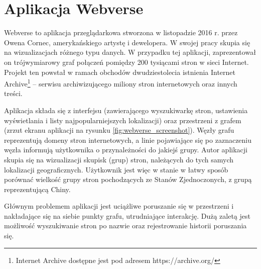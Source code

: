 \section{Aplikacja Webverse}

Webverse \cite{Webverse} to aplikacja przeglądarkowa stworzona w listopadzie 2016 r. przez Owena Cornec, amerykańskiego artystę i dewelopera. W swojej pracy skupia się na wizualizacjach różnego typu danych. W przypadku tej aplikacji, zaprezentował on trójwymiarowy graf połączeń pomiędzy 200 tysiącami stron w sieci Internet. Projekt ten powstał w ramach obchodów dwudziestolecia istnienia Internet Archive\footnote{Internet Archive dostępne jest pod adresem https://archive.org/} – serwisu archiwizującego miliony stron internetowych oraz innych treści.

Aplikacja składa się z interfejsu (zawierającego wyszukiwarkę stron, ustawienia wyświetlania i listy najpopularniejszych lokalizacji) oraz przestrzeni z grafem (zrzut ekranu aplikacji na rysunku \ref{fig:webverse_screenshot}). Węzły grafu reprezentują domeny stron internetowych, a linie pojawiające się po zaznaczeniu węzła informują użytkownika o przynależności do jakiejś grupy. Autor aplikacji skupia się na wizualizacji skupisk (grup) stron, należących do tych samych lokalizacji geograficznych. Użytkownik jest więc w stanie w łatwy sposób porównać wielkość grupy stron pochodzących ze Stanów Zjednoczonych, z grupą reprezentującą Chiny.

Głównym problemem aplikacji jest uciążliwe poruszanie się w przestrzeni i nakładające się na siebie punkty grafu, utrudniające interakcję. Dużą zaletą jest możliwość wyszukiwanie stron po nazwie oraz rejestrowanie historii poruszania się.


